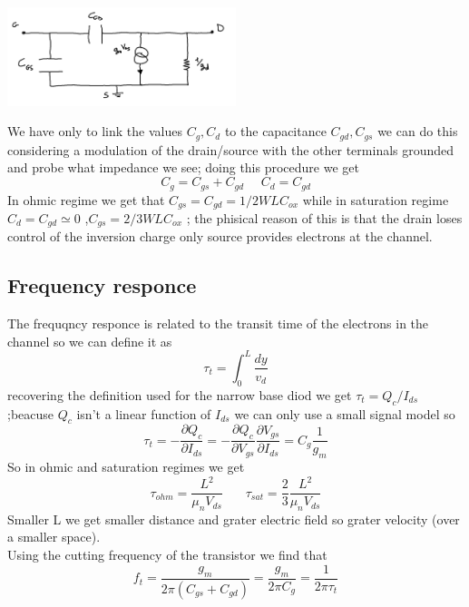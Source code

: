 \centering
\includegraphics[width=0.5\textwidth]{smallsig.png}\\
\raggedright

We have only to link the values $C_g,C_d$ to the capacitance $C_{gd},C_{gs}$ we can do this considering a modulation of the drain/source with the other terminals grounded and probe what impedance we see; doing this procedure we get 
\begin{equation}
C_g=C_{gs}+C_{gd} \ \ \ \ \ \ C_d=C_{gd}
\end{equation}
In ohmic regime we get that $C_{gs}=C_{gd}=1/2WLC_{ox}$ while in saturation regime $C_d=C_{gd}\simeq 0$ ,$C_{gs}=2/3WLC_{ox}$ ; the phisical reason of this is that the drain loses control of the inversion charge only source provides electrons at the channel.\\

\subsection{Frequency responce} 
The frequqncy responce is related to the transit time of the electrons in the channel so we can define it as 
\begin{equation}
\tau_t=\int_0^L \frac{dy}{v_d}
\end{equation}
recovering the definition used for the narrow base diod we get $\tau_t=Q_c/I_{ds}$ ;beacuse $Q_c$ isn't a linear function of $I_{ds}$ we can only use a small signal model so
\begin{equation}
\tau_t= -\frac{\partial Q_c}{\partial I_{ds}}= -\frac{\partial Q_c}{\partial V_{gs}}\frac{\partial V_{gs}}{\partial I_{ds}}=C_g \frac{1}{g_m}
\end{equation}
So in ohmic and saturation regimes we get
\begin{equation}
\tau_{ohm}=\frac{L^2}{\mu_nV_{ds}}\ \ \ \ \ \ \ \ \tau_{sat}=\frac{2}{3} \frac{L^2}{\mu_nV_{ds}}
\end{equation}
Smaller L we get smaller distance and grater electric field so grater velocity (over a smaller space).\\
Using the cutting frequency of the transistor we find that 
\begin{equation}
f_t=\frac{g_m}{2\pi (C_{gs}+C_{gd})}=\frac{g_m}{2\pi C_g}=\frac{1}{2\pi \tau_t}
\end{equation}


